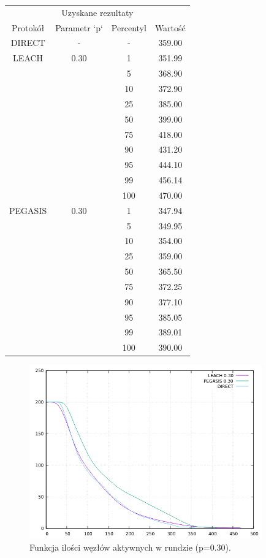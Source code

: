 \documentclass[a4paper,12pt,twoside,openany]{report}
\begin{document}
\begin{longtable}{*{4}{c}}
\toprule
\multicolumn{4}{c}{Uzyskane rezultaty} \\
Protokół	& Parametr `p`	& Percentyl	& Wartość \\
\midrule
\endhead
DIRECT	& - 	& -	& 359.00 \\*
\midrule
LEACH	& 0.30	& 1	& 351.99 \\*
	&	& 5	& 368.90 \\*
	&	& 10	& 372.90 \\*
	&	& 25	& 385.00 \\*
	&	& 50	& 399.00 \\*
	&	& 75	& 418.00 \\*
	&	& 90	& 431.20 \\*
	&	& 95	& 444.10 \\*
	&	& 99	& 456.14 \\*
	&	& 100	& 470.00 \\*
\midrule
PEGASIS	& 0.30	& 1	& 347.94 \\*
	&	& 5	& 349.95 \\*
	&	& 10	& 354.00 \\*
	&	& 25	& 359.00 \\*
	&	& 50	& 365.50 \\*
	&	& 75	& 372.25 \\*
	&	& 90	& 377.10 \\*
	&	& 95	& 385.05 \\*
	&	& 99	& 389.01 \\*
	&	& 100	& 390.00 \\*
\bottomrule
\end{longtable}

\begin{figure}[H]
 \centering
 \includegraphics[width=10cm]{images/gnuplot/test_4/nodes_in_round_p030.png}
 \caption{Funkcja ilości węzłów aktywnych w rundzie (p=0.30).}
\end{figure}
\end{document}
